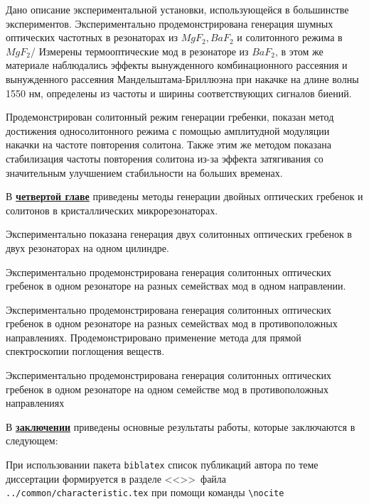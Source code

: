 Дано описание экспериментальной установки, использующейся в большинстве экспериментов. Экспериментально продемонстрирована генерация шумных оптических частотных в резонаторах из $MgF_2,BaF_2$ и солитонного режима в $MgF_2$/ Измерены термооптические мод в резонаторе из $BaF_2$, в этом же материале наблюдались эффекты вынужденного комбинационного рассеяния и вынужденного рассеяния Мандельштама-Бриллюэна при накачке на длине волны 1550 нм, определены из частоты и ширины соответствующих сигналов биений.

Продемонстрирован солитонный режим генерации гребенки, показан метод достижения односолитонного режима с помощью амплитудной модуляции накачки на частоте повторения солитона. Также этим же методом показана стабилизация частоты повторения солитона из-за эффекта затягивания со значительным улучшением стабильности на больших временах.


В \underline{\textbf{четвертой главе}} приведены методы генерации двойных оптических гребенок и солитонов в кристаллических микрорезонаторах.

Экспериментально показана генерация двух солитонных оптических гребенок в двух резонаторах на одном цилиндре.

Экспериментально продемонстрирована генерация солитонных оптических гребенок в одном резонаторе на разных семействах мод в одном направлении.

Экспериментально продемонстрирована генерация солитонных оптических гребенок в одном резонаторе на разных семействах мод в противоположных направлениях. Продемонстрировано применение метода для прямой спектроскопии поглощения веществ.

Экспериментально продемонстрирована генерация солитонных оптических гребенок в одном резонаторе на одном семействе мод в противоположных направлениях

В \underline{\textbf{заключении}} приведены основные результаты работы, которые заключаются в следующем:



При использовании пакета \verb!biblatex! список публикаций автора по теме
диссертации формируется в разделе <<\publications>>\ файла
\verb!../common/characteristic.tex!  при помощи команды \verb!\nocite!


